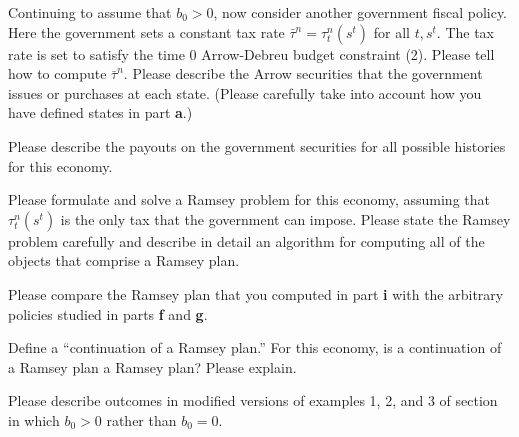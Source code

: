 \medskip


  Continuing to assume that  $b_0  >0$, now consider another government fiscal policy.  Here the government
sets a constant tax rate $\bar \tau^n = \tau_t^n(s^t)$ for all $t, s^t$.  The tax rate is set to satisfy the time $0$ Arrow-Debreu
budget constraint (2).  Please tell how to compute $\bar \tau^n$. Please describe the Arrow securities that the government
issues or purchases at each state. (Please carefully take into account how you have defined states in part {\bf a}.)

\medskip
{} Please describe the payouts on the government securities for all possible histories for this economy.

\medskip
{}  Please formulate and solve a Ramsey problem for this economy, assuming  that $\tau_t^n(s^t)$ is the only tax that the government
can impose.  Please state the Ramsey problem carefully and describe in detail an algorithm for computing all of the objects that comprise a Ramsey plan.

\medskip
{}  Please compare the Ramsey plan that you computed in part {\bf i} with the arbitrary policies studied in parts {\bf f} and {\bf g}.

\medskip

 Define a ``continuation of a Ramsey plan.''  For this economy, is a continuation of a Ramsey plan a Ramsey plan? Please explain.


\medskip
{} 

\medskip
\noindent Please describe outcomes in  modified versions of examples 1, 2, and 3 of section  in which $b_0 >0$ rather than $b_0 = 0$.
